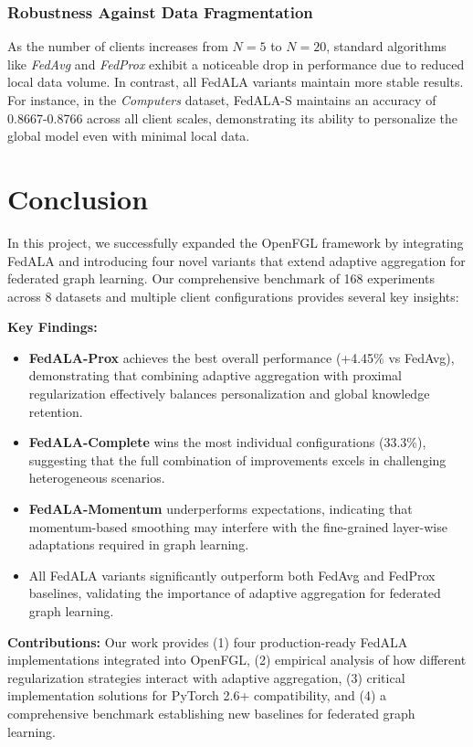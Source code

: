 \documentclass[10pt,conference,compsocconf,letterpaper]{IEEEtran}
\begin{document}
\subsubsection{Robustness Against Data Fragmentation}
As the number of clients increases from $N=5$ to $N=20$, standard algorithms like \textit{FedAvg} and \textit{FedProx} exhibit a noticeable drop in performance due to reduced local data volume. In contrast, all FedALA variants maintain more stable results. For instance, in the \textit{Computers} dataset, FedALA-S maintains an accuracy of 0.8667-0.8766 across all client scales, demonstrating its ability to personalize the global model even with minimal local data.

\section{Conclusion}

In this project, we successfully expanded the OpenFGL framework by integrating FedALA and introducing four novel variants that extend adaptive aggregation for federated graph learning. Our comprehensive benchmark of 168 experiments across 8 datasets and multiple client configurations provides several key insights:

\textbf{Key Findings:}
\begin{itemize}
    \item \textbf{FedALA-Prox} achieves the best overall performance (+4.45\% vs FedAvg), demonstrating that combining adaptive aggregation with proximal regularization effectively balances personalization and global knowledge retention.
    \item \textbf{FedALA-Complete} wins the most individual configurations (33.3\%), suggesting that the full combination of improvements excels in challenging heterogeneous scenarios.
    \item \textbf{FedALA-Momentum} underperforms expectations, indicating that momentum-based smoothing may interfere with the fine-grained layer-wise adaptations required in graph learning.
    \item All FedALA variants significantly outperform both FedAvg and FedProx baselines, validating the importance of adaptive aggregation for federated graph learning.
\end{itemize}

\textbf{Contributions:} Our work provides (1) four production-ready FedALA implementations integrated into OpenFGL, (2) empirical analysis of how different regularization strategies interact with adaptive aggregation, (3) critical implementation solutions for PyTorch 2.6+ compatibility, and (4) a comprehensive benchmark establishing new baselines for federated graph learning.
\end{document}
